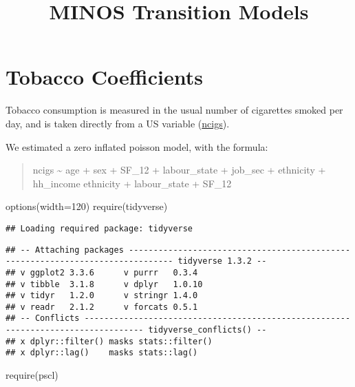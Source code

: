 \documentclass[
]{article}
\title{MINOS Transition Models}
\author{}
\date{\vspace{-2.5em}}
\newenvironment{Shaded}{\begin{snugshade}}{\end{snugshade}}
\newcommand{\AttributeTok}[1]{\textcolor[rgb]{0.77,0.63,0.00}{#1}}
\newcommand{\DecValTok}[1]{\textcolor[rgb]{0.00,0.00,0.81}{#1}}
\newcommand{\FunctionTok}[1]{\textcolor[rgb]{0.00,0.00,0.00}{#1}}
\newcommand{\NormalTok}[1]{#1}
\begin{document}
\maketitle

\hypertarget{tobacco-coefficients}{%
\section{Tobacco Coefficients}\label{tobacco-coefficients}}

Tobacco consumption is measured in the usual number of cigarettes smoked
per day, and is taken directly from a US variable
(\href{https://www.understandingsociety.ac.uk/documentation/mainstage/dataset-documentation/variable/ncigs}{ncigs}).

We estimated a zero inflated poisson model, with the formula:

\begin{quote}
ncigs \textasciitilde{} age + sex + SF\_12 + labour\_state + job\_sec +
ethnicity + hh\_income \textbar{} ethnicity + labour\_state + SF\_12
\end{quote}

\begin{Shaded}
\begin{Highlighting}[]
\FunctionTok{options}\NormalTok{(}\AttributeTok{width=}\DecValTok{120}\NormalTok{)}
\FunctionTok{require}\NormalTok{(tidyverse)}
\end{Highlighting}
\end{Shaded}

\begin{verbatim}
## Loading required package: tidyverse
\end{verbatim}

\begin{verbatim}
## -- Attaching packages ------------------------------------------------------------------------------- tidyverse 1.3.2 --
## v ggplot2 3.3.6      v purrr   0.3.4 
## v tibble  3.1.8      v dplyr   1.0.10
## v tidyr   1.2.0      v stringr 1.4.0 
## v readr   2.1.2      v forcats 0.5.1 
## -- Conflicts ---------------------------------------------------------------------------------- tidyverse_conflicts() --
## x dplyr::filter() masks stats::filter()
## x dplyr::lag()    masks stats::lag()
\end{verbatim}

\begin{Shaded}
\begin{Highlighting}[]
\FunctionTok{require}\NormalTok{(pscl)}
\end{Highlighting}
\end{Shaded}
\end{document}

